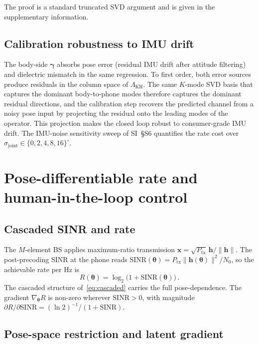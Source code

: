 \documentclass[journal,twocolumn,10pt]{IEEEtran}
\theoremstyle{plain}
\theoremstyle{definition}
\theoremstyle{remark}
\newcommand{\xx}{\mathbf{x}}
\newcommand{\hh}{\bm{h}}
\newcommand{\thetab}{\bm{\theta}}
\newcommand{\gammab}{\bm{\gamma}}
\begin{document}
The proof is a standard truncated SVD argument and is given in
the supplementary information.

\subsection{Calibration robustness to IMU drift}

The body-side $\gammab$ absorbs pose error (residual IMU drift
after attitude filtering) and dielectric mismatch in the same
regression. To first order, both error sources produce residuals
in the column space of $\Lambda_{\mathrm{KH}}$. The same $K$-mode
SVD basis that captures the dominant body-to-phone modes therefore
captures the dominant residual directions, and the calibration
step recovers the predicted channel from a noisy pose input by
projecting the residual onto the leading modes of the operator.
This projection makes the closed loop robust to consumer-grade IMU
drift. The IMU-noise sensitivity sweep of SI~\S{}S6 quantifies the
rate cost over $\sigma_{\mathrm{joint}} \in
\{0,2,4,8,16\}^{\circ}$.


\section{Pose-differentiable rate and human-in-the-loop control}\label{sec:control}

\subsection{Cascaded SINR and rate}

The $M$-element BS applies maximum-ratio transmission
$\xx = \sqrt{P_{\mathrm{tx}}}\,\hh / \|\hh\|$. The post-precoding
SINR at the phone reads
$\mathrm{SINR}(\thetab) = P_{\mathrm{tx}} \|\hh(\thetab)\|^{2} / N_0$,
so the achievable rate per Hz is
\begin{equation}\label{eq:rate}
R(\thetab) = \log_2\bigl(1 + \mathrm{SINR}(\thetab)\bigr)\,.
\end{equation}
The cascaded structure of~\eqref{eq:cascaded} carries the full
pose-dependence. The gradient $\nabla_{\thetab} R$ is non-zero
wherever $\mathrm{SINR}>0$, with magnitude
$\partial R / \partial \mathrm{SINR} = (\ln 2)^{-1}/(1 + \mathrm{SINR})$.

\subsection{Pose-space restriction and latent gradient}\label{sec:vposer-latent}
\end{document}
